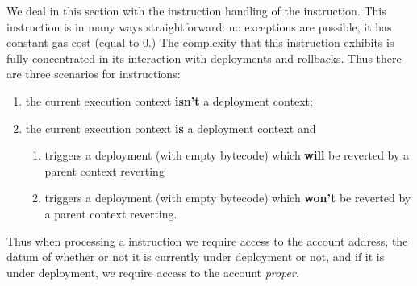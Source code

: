 We deal in this section with the instruction handling of the  instruction. This instruction is in many ways straightforward: no exceptions are possible, it has constant gas cost (equal to 0.) The complexity that this instruction exhibits is fully concentrated in its interaction with deployments and rollbacks. Thus there are three scenarios for  instructions:
\begin{enumerate}
        \item the current execution context \textbf{isn't} a deployment context;
        \item the current execution context \textbf{is} a deployment context and
		\begin{enumerate}
		        \item {} triggers a deployment (with empty bytecode) which \textbf{will} be reverted by a parent context reverting 
		        \item {} triggers a deployment (with empty bytecode) which \textbf{won't} be reverted by a parent context reverting.
		\end{enumerate}
\end{enumerate}
Thus when processing a  instruction we require access to the account address, the datum of whether or not it is currently under deployment or not, and if it is under deployment, we require access to the account \emph{proper}.
